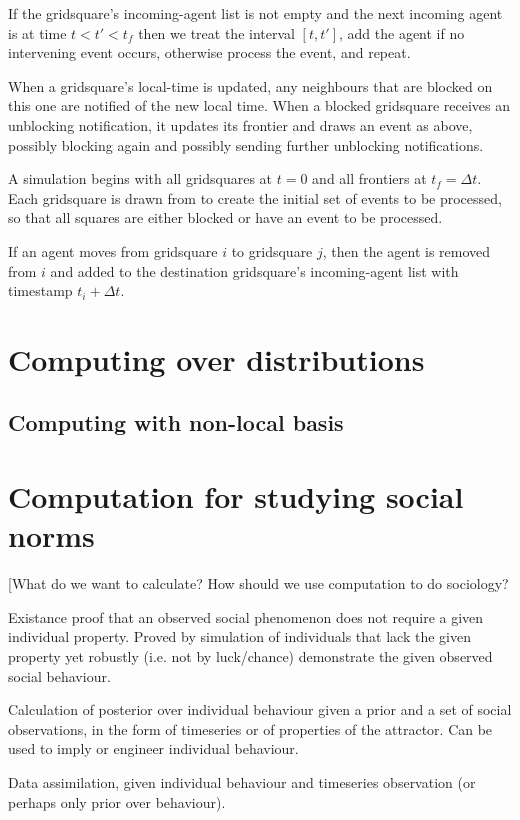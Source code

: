 \documentclass[a4paper]{article}
\begin{document}
If the gridsquare's incoming-agent list is not empty and the next incoming agent is at time  $t < t' < t_f$ then we treat the interval $[t, t']$, add the agent if no intervening event occurs, otherwise process the event, and repeat.

When a gridsquare's local-time is updated, any neighbours that are blocked on this one are notified of the new local time. When a blocked gridsquare receives an unblocking notification, it updates its frontier and draws an event as above, possibly blocking again and possibly sending further unblocking notifications.

A simulation begins with all gridsquares at $t=0$ and all frontiers at $t_f=\Delta t$. Each gridsquare is drawn from to create the initial set of events to be processed, so that all squares are either blocked or have an event to be processed.

If an agent moves from gridsquare $i$ to gridsquare $j$, then the agent is removed from $i$ and added to the destination gridsquare's incoming-agent list with timestamp $t_i + \Delta t$.

\section{Computing over distributions}

\subsection{Computing with non-local basis}



\section{Computation for studying social norms}

[What do we want to calculate? How should we use computation to do sociology?

Existance proof that an observed social phenomenon does not require a given individual property. Proved by simulation of individuals that lack the given property yet robustly (i.e. not by luck/chance) demonstrate the given observed social behaviour.

Calculation of posterior over individual behaviour given a prior and a set of social observations, in the form of timeseries or of properties of the attractor. Can be used to imply or engineer individual behaviour.

Data assimilation, given individual behaviour and timeseries observation (or perhaps only prior over behaviour).
\end{document}
